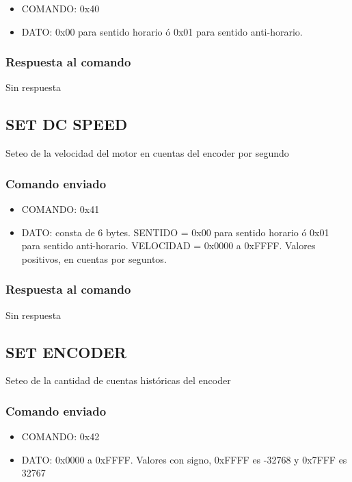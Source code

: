 \documentclass[a4paper,10pt]{article}
\begin{document}
\begin{itemize}
	\item{COMANDO:} 0x40
	\item{DATO:} 0x00 para sentido horario \'o 0x01 para sentido anti-horario.
\end{itemize}

\subsubsection*{Respuesta al comando}

Sin respuesta

\subsection{SET DC SPEED}
\label{set_dc_speed}

Seteo de la velocidad del motor en cuentas del encoder por segundo

\subsubsection*{Comando enviado}

\begin{itemize}
	\item{COMANDO:} 0x41
	\item{DATO:} consta de 6 bytes.
		SENTIDO = 0x00 para sentido horario \'o 0x01 para sentido anti-horario.
		VELOCIDAD = 0x0000 a 0xFFFF. Valores positivos, en cuentas por seguntos.
\end{itemize}

\subsubsection*{Respuesta al comando}

Sin respuesta

\subsection{SET ENCODER}
\label{set_encoder}

Seteo de la cantidad de cuentas hist\'oricas del encoder

\subsubsection*{Comando enviado}

\begin{itemize}
	\item{COMANDO:} 0x42
	\item{DATO:} 0x0000 a 0xFFFF. Valores con signo, 0xFFFF es -32768 y 0x7FFF es 32767
\end{itemize}
\end{document}
